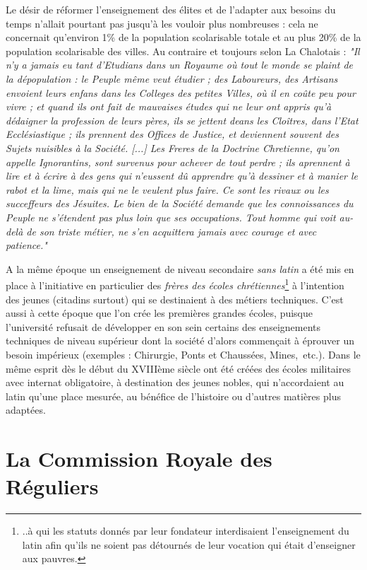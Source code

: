 Le désir de réformer l'enseignement des élites  et de l'adapter aux besoins du temps n'allait pourtant pas jusqu'à les vouloir plus nombreuses : cela ne concernait qu'environ 1\% de la population scolarisable totale et au plus 20\% de la population scolarisable des villes. Au contraire et toujours selon La Chalotais : \emph{"Il n'y a jamais eu tant d'Etudians dans un Royaume où tout le monde se plaint de la dépopulation : le Peuple même veut étudier ; des Laboureurs, des Artisans envoient leurs enfans dans les Colleges des petites Villes, où il en coûte peu pour vivre ; et quand ils ont fait de mauvaises études qui ne leur ont appris qu'à dédaigner la profession de leurs pères, ils se jettent deans les Cloîtres, dans l'Etat Ecclésiastique ; ils prennent des Offices de Justice, et deviennent souvent des Sujets nuisibles à la Société. [...] Les Freres de la Doctrine Chretienne, qu'on appelle Ignorantins, sont survenus pour achever de tout perdre ; ils aprennent à lire et à écrire à des gens qui n'eussent dû apprendre qu'à dessiner et à manier le rabot et la lime, mais qui ne le veulent plus faire. Ce sont les rivaux ou les succeffeurs des Jésuites. Le bien de la Société demande que les connoissances du Peuple ne s'étendent pas plus loin que ses occupations. Tout homme qui voit au-delà de son triste métier, ne s'en acquittera jamais avec courage et avec patience."} 

A la même époque un enseignement de niveau secondaire \emph{sans latin} a été mis en place à l'initiative en particulier des \emph{frères des écoles chrétiennes}\footnote{..à qui les statuts donnés par leur fondateur interdisaient l'enseignement du latin afin qu'ils ne soient pas détournés de leur vocation qui était d'enseigner aux pauvres.} à l'intention des jeunes (citadins surtout) qui se destinaient à des métiers techniques. C'est aussi à cette époque que l'on crée les premières grandes écoles, puisque l'université refusait de développer en son sein certains des enseignements techniques de niveau supérieur dont la société d'alors commençait à éprouver un besoin impérieux (exemples : Chirurgie, Ponts et Chaussées, Mines,~etc.). Dans le même esprit dès le début du XVIIIème siècle ont été créées des écoles militaires avec internat obligatoire, à destination des jeunes nobles, qui n'accordaient au latin qu'une place mesurée, au bénéfice de l'histoire ou d'autres matières plus adaptées. 





\section{La Commission Royale des Réguliers}


